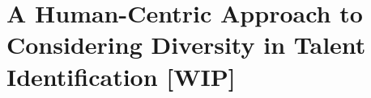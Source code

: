 

\chapter{\label{ch:iaicodesign}A Human-Centric Approach to Considering Diversity in Talent Identification [WIP]} %



\minitoc

